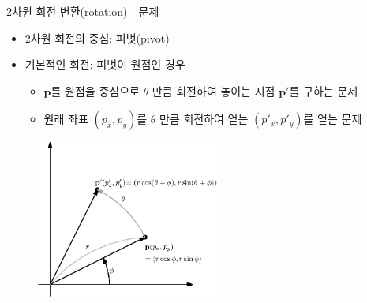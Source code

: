 \begin{frame}{2차원 회전 변환(rotation) - 문제}

{\small
\begin{itemize}
\item 2차원 회전의 중심: 피벗(pivot)
\item 기본적인 회전: 피벗이 원점인 경우
	\begin{itemize}
	\item $\mathbf p$를 원점을 중심으로 $\theta$ 만큼 회전하여 놓이는 지점 $\mathbf p'$를 구하는 문제
	\item 원래 좌표 $(p_x,p_y)$를 $\theta$ 만큼 회전하여 얻는 $(p'_x, p'_y)$를 얻는 문제
	\end{itemize}
\end{itemize}

\begin{figure}
    \includegraphics[width=6cm]{Math_transform/rotation.eps}
\end{figure}


}

\end{frame}


